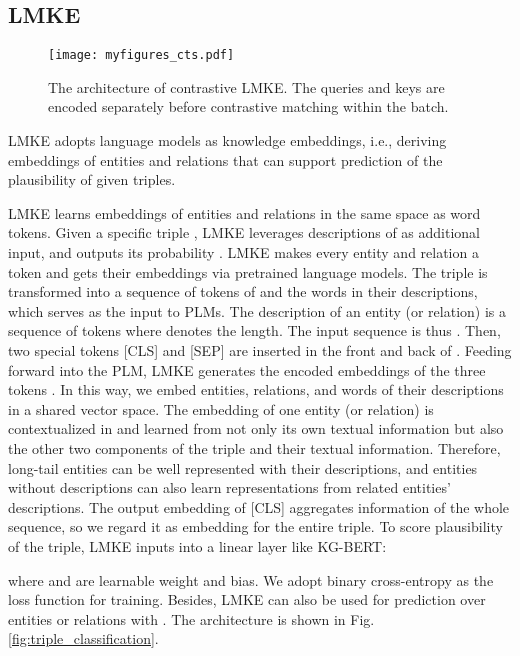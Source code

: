 \documentclass{article}
\begin{document}
\subsection{LMKE}

\begin{figure*}[htbp]
  \centering
   \texttt{[image: myfigures\_cts.pdf]}


  \caption{The architecture of contrastive LMKE. The queries and keys are encoded separately before contrastive matching within the batch. 
}
  \label{fig:link_prediction_contrastive}

\end{figure*}






LMKE adopts language models as knowledge embeddings, i.e., deriving embeddings of entities and relations that can support prediction of the plausibility of given triples. 

LMKE learns embeddings of entities and relations in the same space as word tokens.
Given a specific triple , LMKE leverages descriptions  of  as additional input, and outputs its probability .
LMKE makes every entity and relation a token and gets their embeddings via pretrained language models.
The triple is transformed into a sequence of tokens of  and the words in their descriptions, which serves as the input to PLMs.
The description of an entity (or relation)  is a sequence of tokens  where  denotes the length. 
The input sequence is thus 
.
Then, two special tokens [CLS] and [SEP] are inserted in the front and back of .
Feeding forward  into the PLM, 
LMKE generates the encoded embeddings  of the three tokens . 
In this way, we embed entities, relations, and words of their descriptions in a shared vector space. 
The embedding of one entity (or relation) is contextualized in and learned from not only its own textual information but also the other two components of the triple and their textual information.
Therefore, long-tail entities can be well represented with their descriptions, 
and entities without descriptions can also learn representations from related entities' descriptions. 
The output embedding of [CLS] aggregates information of the whole sequence, so we regard it as embedding  for the entire triple. 
To score plausibility  of the triple, LMKE inputs  into a linear layer like KG-BERT:

where  and  are learnable weight and bias. 
We adopt binary cross-entropy as the loss function for training. 
Besides,
LMKE can also be used for prediction over entities or relations with . 
The architecture is shown in Fig. \ref{fig:triple_classification}. 
\end{document}
